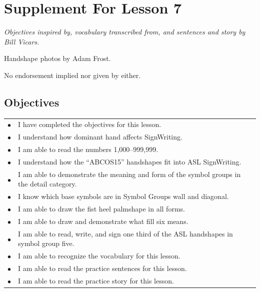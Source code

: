 \documentclass{article}
\begin{document}
\newfontfamily{}
\newfontfamily{}
\newcommand{\bul}{\hfil$\bullet$&}
\renewenvironment{glossary}{\begin{multicols}{5}\begin{center}}{\end{center}\end{multicols}}
\setcounter{secnumdepth}{0}
\setlength{\columnseprule}{1pt}

\section{Supplement For Lesson 7}

\begin{center}
\it
Objectives inspired by, vocabulary transcribed from, and sentences and story by Bill Vicars.

Handshape photos by Adam Frost.

No endorsement implied nor given by either.
\end{center}

\subsection{Objectives}

\begin{tabular}{p{1cm}p{14cm}}
\bul I have completed the objectives for this lesson.\\
\bul I understand how dominant hand affects SignWriting.\\
\bul I am able to read the numbers 1,000--999,999.\\
\bul I understand how the ``ABCOS15'' handshapes fit into ASL SignWriting.\\
\bul I am able to demonstrate the meaning and form of the symbol groups in the detail category.\\
\bul I know which base symbols are in Symbol Groups wall and diagonal.\\
\bul I am able to draw the fist heel palmshape in all forms.\\
\bul I am able to draw and demonstrate what fill six means.\\
\bul I am able to read, write, and sign one third of the ASL handshapes in symbol group five.\\
\bul I am able to recognize the vocabulary for this lesson.\\
\bul I am able to read the practice sentences for this lesson.\\
\bul I am able to read the practice story for this lesson.\\
\end{tabular}
\end{document}
